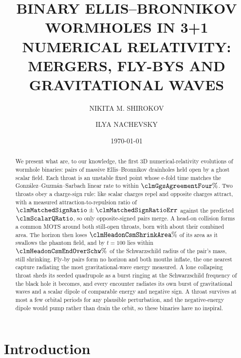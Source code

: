 \documentclass[twocolumn,floatfix,aps,prd,superscriptaddress,nofootinbib]{revtex4-2}
\begin{document}
\title{\texorpdfstring{\MakeTextUppercase{Binary Ellis--Bronnikov wormholes in 3+1 numerical relativity: mergers, fly-bys and gravitational waves}}{Binary Ellis-Bronnikov wormholes in 3+1 numerical relativity: mergers, fly-bys and gravitational waves}}

\author{\MakeTextUppercase{Nikita M. Shirokov}}
\author{\MakeTextUppercase{Ilya Nachevsky}}
\date{\today}


\begin{abstract}
We present what are, to our knowledge, the first 3D numerical-relativity evolutions of wormhole binaries: pairs of massive Ellis--Bronnikov drainholes held open by a ghost scalar field. Each throat is an unstable fixed point whose e-fold time matches the Gonz\'alez--Guzm\'an--Sarbach linear rate to within $\clmGgsAgreementFour\%$. Two throats obey a charge-sign rule: like scalar charges repel and opposite charges attract, with a measured attraction-to-repulsion ratio of $\clmMatchedSignRatio\pm\clmMatchedSignRatioErr$ against the predicted $\clmScalarQRatio$, so only opposite-signed pairs merge. A head-on collision forms a common MOTS around both still-open throats, born with about their combined area. The horizon then loses $\clmHeadonCsmShrinkArea\%$ of its area as it swallows the phantom field, and by $t=100$ lies within $\clmHeadonCsmEndOverSchw\%$ of the Schwarzschild radius of the pair's mass, still shrinking. Fly-by pairs form no horizon and both mouths inflate, the one nearest capture radiating the most gravitational-wave energy measured. A lone collapsing throat sheds its seeded quadrupole as a burst ringing at the Schwarzschild frequency of the black hole it becomes, and every encounter radiates its own burst of gravitational waves and a scalar dipole of comparable energy and negative sign. A throat survives at most a few orbital periods for any plausible perturbation, and the negative-energy dipole would pump rather than drain the orbit, so these binaries have no inspiral.
\end{abstract}

\maketitle

\section{Introduction}
\label{sec:intro}
\end{document}
